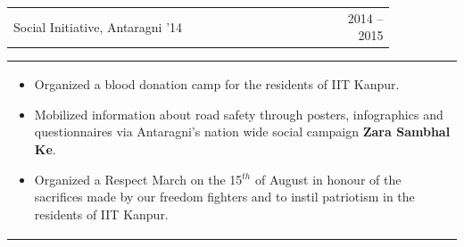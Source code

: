 \documentclass[a4paper,10pt]{article} %
\newcommand{\iproject}[3]{
    \begin{tabular}{p{0.85\linewidth}r}
        \textcolor{NavyBlue}{#2} & \multicolumn{1}{m{3cm}}{\raggedleft \textsc{#1}}\\
    \end{tabular}
    \begin{tabular}{p{\linewidth}}
    \vspace{-0.3cm}
        \footnotesize{#3}
    \end{tabular}
    \vspace{-0.5cm}
}
\begin{document}
\iproject {2014 -- 2015}
          {Social Initiative, Antaragni '14}
          {
               \begin{itemize}[leftmargin=0.5cm]
                   \item Organized a blood donation camp for the residents of IIT Kanpur.
                   \item Mobilized information about road safety through posters, infographics and questionnaires
                       via Antaragni's nation wide social campaign \textbf{Zara Sambhal Ke}.
                   \item Organized a Respect March on the 15$^{th}$ of August in honour of the sacrifices made by our
                       freedom fighters and to instil patriotism in the residents of IIT Kanpur.
               \end{itemize}
          }
\end{document}
